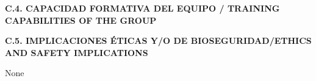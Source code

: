 \documentclass[a4paper,11pt,oneside]{article}
\begin{document}
\vspace{12pt}

\noindent\textbf{C.4. CAPACIDAD FORMATIVA DEL EQUIPO / TRAINING CAPABILITIES OF THE GROUP}
%

%
%
%
%


\vspace{12pt}

\noindent\textbf{C.5. IMPLICACIONES ÉTICAS Y/O DE BIOSEGURIDAD/ETHICS AND SAFETY IMPLICATIONS}

None
\end{document}
